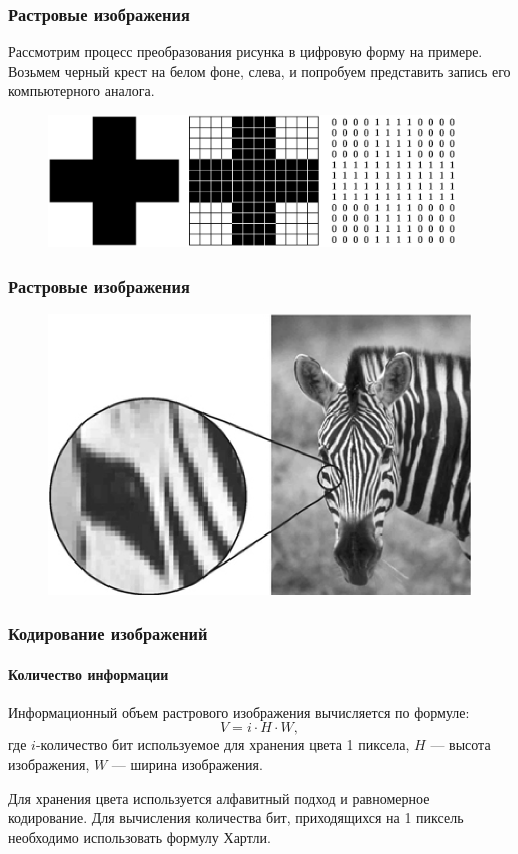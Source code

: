 \begin{frame}
\frametitle{Растровые изображения}

Рассмотрим процесс преобразования рисунка в цифровую форму на примере. Возьмем черный крест на белом фоне, слева, и попробуем представить запись его компьютерного аналога.
\begin{figure}[htbp] \begin{center}
\includegraphics[height=3.5cm]{images/part18}
\end{center} \end{figure}
\end{frame} 

\begin{frame}
\frametitle{Растровые изображения}

\begin{figure}[htbp] \begin{center}
\includegraphics{images/raster}
\end{center} \end{figure}
\end{frame}

\begin{frame}
\frametitle{Кодирование изображений}
\framesubtitle{Количество информации}

Информационный объем растрового изображения вычисляется по формуле:
$$ V=i\cdot H\cdot W,$$
где $i$-количество бит используемое для хранения цвета 1 пиксела, $H$ --- высота изображения, $W$ --- ширина изображения.

Для хранения цвета используется алфавитный подход и равномерное кодирование.
Для вычисления количества бит, приходящихся на 1 пиксель необходимо использовать формулу Хартли.
\end{frame}

